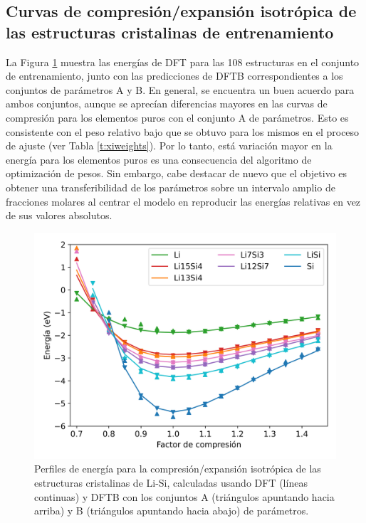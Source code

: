 \subsection{Curvas de compresión/expansión isotrópica de las estructuras 
cristalinas de entrenamiento}

La Figura \ref{fig:compresion} muestra las energías de DFT para las 108 
estructuras en el conjunto de entrenamiento, junto con las predicciones de
DFTB correspondientes a los conjuntos de parámetros A y B. En general, se 
encuentra un buen acuerdo para ambos conjuntos, aunque se aprecían diferencias
mayores en las curvas de compresión para los elementos puros con el conjunto 
A de parámetros. Esto es consistente con el peso relativo bajo que se obtuvo
para los mismos en el proceso de ajuste (ver Tabla \ref{t:xiweights}). Por lo 
tanto, está variación mayor en la energía para los elementos puros es una 
consecuencia del algoritmo de optimización de pesos. Sin embargo, cabe 
destacar de nuevo que el objetivo es obtener una transferibilidad de los 
parámetros sobre un intervalo amplio de fracciones molares al centrar el 
modelo en reproducir las energías relativas en vez de sus valores absolutos.

\begin{figure}[th]
    \centering
    \includegraphics[width=.7\textwidth]{Silicio/modelo/resultados/compresion/compresion.png}
    \caption{Perfiles de energía para la compresión/expansión isotrópica de las 
    estructuras cristalinas de Li-Si, calculadas usando DFT (líneas continuas) 
    y DFTB con los conjuntos A (triángulos apuntando hacia arriba) y B 
    (triángulos apuntando hacia abajo) de parámetros.}
    \label{fig:compresion}
\end{figure}
